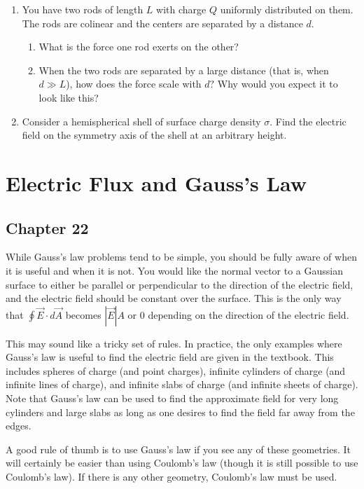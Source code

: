 \documentclass[12pt]{book}
\begin{document}
\begin{enumerate}
 \item You have two rods of length $L$ with charge $Q$ uniformly distributed on them. The rods are colinear and the centers are separated by a distance $d.$

 \begin{enumerate}
\item What is the force one rod exerts on the other?
\item When the two rods are separated by a large distance (that is, when $d\gg L$), how does the force scale with $d?$ Why would you expect it to look like this?
 \end{enumerate}
 
 \item Consider a hemispherical shell of surface charge density $\sigma$. Find the electric field on the symmetry axis of the shell at an arbitrary height.
 
\end{enumerate}

\chapter{Electric Flux and Gauss's Law}

\section{Chapter 22}

While Gauss's law problems tend to be simple, you should be fully aware of when it is useful and when it is not. You would like the normal vector to a Gaussian surface to either be parallel or perpendicular to the direction of the electric field, and the electric field should be constant over the surface. This is the only way that $\oint \vec{E}\cdot d\vec{A}$ becomes $|\vec{E}| A$ or 0 depending on the direction of the electric field.

This may sound like a tricky set of rules. In practice, the only examples where Gauss's law is useful to find the electric field are given in the textbook. This includes spheres of charge (and point charges), infinite cylinders of charge (and infinite lines of charge), and infinite slabs of charge (and infinite sheets of charge). Note that Gauss's law can be used to find the approximate field for very long cylinders and large slabs as long as one desires to find the field far away from the edges.

A good rule of thumb is to use Gauss's law if you see any of these geometries. It will certainly be easier than using Coulomb's law (though it is still possible to use Coulomb's law). If there is any other geometry, Coulomb's law must be used.
\end{document}
